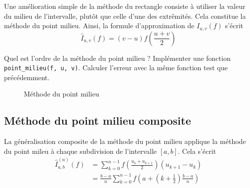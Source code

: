 Une amélioration simple de la méthode du rectangle consiste à utiliser la valeur du milieu de l'intervalle, plutôt que celle d'une des extrêmités. Cela constitue la méthode du point milieu. Ainsi, la formule d'approximation de $ I_{u, v}(f) $ s'écrit \[
    \hat{I}_{u, v}(f) = (v-u)f(\frac{u+v}{2})
\]

\quessques Quel est l'ordre de la méthode du point milieu ?
\ssques Implémenter une fonction \texttt{point\_milieu(f, u, v)}. Calculer l'erreur avec la même fonction test que précédemment.


\begin{figure}[h!]
    \centering
    \caption{Méthode du point milieu}
    \label{fig:point-milieu-method}
\end{figure}

\subsection{Méthode du point milieu composite}

La généralisation composite de la méthode du point milieu applique la méthode du point mileu à chaque subdivision de l'intervalle $ [a, b] $. Cela s'écrit 
\begin{align*}
    \hat{I}^{(n)}_{a, b}(f) &= \sum_{k=0}^{n-1} f(\frac{u_k+u_{k+1}}{2})(u_{k+1}-u_k)\\
                          &= \frac{b-a}{n}\sum_{k=0}^{n-1} f(a + (k+\frac{1}{2}) \frac{b-a}{n}) 
\end{align*}

